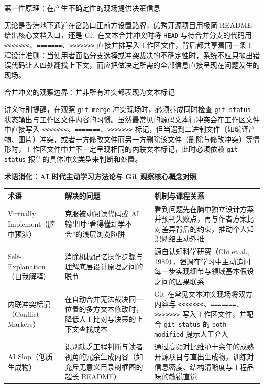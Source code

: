 \documentclass[UTF8,a4paper,11pt,fontset=fandol]{ctexart}
\begin{document}
\begin{knowledgebox}{第一性原理：在产生不确定性的现场提供决策信息}

无论是香港地下通道在岔路口正前方设置路牌，优秀开源项目用极简 README 给出核心文档入口，还是 Git 在文本合并冲突时将 \texttt{HEAD} 与待合并分支的代码用 \texttt{<<<<<<<}、\texttt{=======}、\texttt{>>>>>>>} 直接并排写入工作区文件，背后都共享着同一条工程设计准则：当使用者面临分支选择或冲突裁决的不确定性时，系统不应只抛出错误代码让人四处翻找上下文，而应把做决定所需的全部信息直接呈现在问题发生的现场。

\end{knowledgebox}

\begin{warningbox}{合并冲突的观察边界：并非所有冲突都表现为文本标记}

讲义特别提醒，在观察 \texttt{git merge} 冲突现场时，必须养成同时检查 \texttt{git status} 状态输出与工作区文件内容的习惯。虽然最常见的源码文本行冲突会在工作区文件中直接写入 \texttt{<<<<<<<}、\texttt{=======}、\texttt{>>>>>>>} 标记，但当遇到二进制文件（如编译产物、图片）冲突，或者一方修改文件而另一方删除该文件（删除与修改冲突）等情形时，工作区文件中并不一定呈现相同的内联文本标记，此时必须依赖 \texttt{git status} 报告的具体冲突类型来判断和处置。

\end{warningbox}

\par{}\textbf{术语消化：AI 时代主动学习方法论与 Git 观察核心概念对照}

\begin{center}\small\begin{tabularx}{\linewidth}{YYY}

\toprule

术语 & 解决的问题 & 机制与课程关系\\\midrule

Virtually Implement（脑中预演） & 克服被动阅读代码或 AI 输出时“看得懂却学不会”的浅层浏览陷阱 & 看到问题先在脑中独立设计方案并预判失败点，再与作者方案比对差异背后的约束，推动个人知识网络主动外推\\[3pt]

Self-Explanation（自我解释） & 消除机械记忆操作步骤与理解底层设计原理之间的脱节 & 源自认知科学研究（Chi et al., 1989），强调在学习中主动追问每一步实现细节与领域基本假设之间的因果联系\\[3pt]

内联冲突标记（Conflict Markers） & 在自动合并无法裁决同一位置的多方文本修改时，降低人工比对与决策的上下文查找成本 & Git 在常见文本冲突现场将双方内容与 \texttt{<<<<<<<}、\texttt{=======}、\texttt{>>>>>>>} 写入工作区文件，并配合 \texttt{git status} 的 \texttt{both modified} 提示人工介入\\[3pt]

AI Slop（低质生成物） & 识别缺乏工程判断与读者视角的冗余生成内容（如充斥无意义目录树框图的超长 README） & 通过高频对比维护十余年的成熟开源项目与直出生成物，训练对信息密度、结构清晰度与工程品味的敏锐直觉\\[3pt]

\bottomrule\end{tabularx}\end{center}
\end{document}
